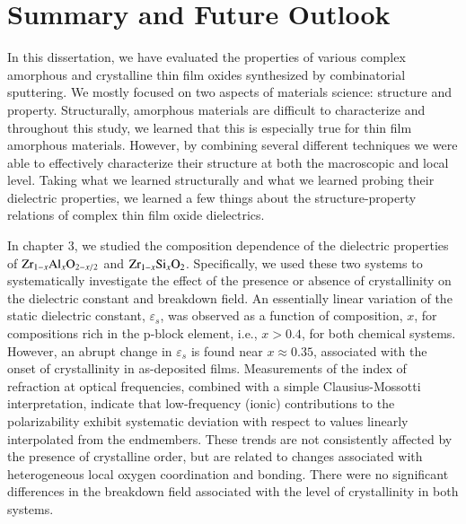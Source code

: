 \chapter{Summary and Future Outlook}

In this dissertation, we have evaluated the properties of various complex amorphous and crystalline thin film oxides synthesized by combinatorial sputtering. We mostly focused on two aspects of materials science: structure and property. Structurally, amorphous materials are difficult to characterize and throughout this study, we learned that this is especially true for thin film amorphous materials. However, by combining several different techniques we were able to effectively characterize their structure at both the macroscopic and local level. Taking what we learned structurally and what we learned probing their dielectric properties, we learned a few things about the structure-property relations of complex thin film oxide dielectrics.  

In chapter 3, we studied the composition dependence of the dielectric properties of $\textnormal{Zr}_{1-x}\textnormal{Al}_{x}\textnormal{O}_{2-x/2}$ and $\textnormal{Zr}_{1-x}\textnormal{Si}_{x}\textnormal{O}_{2}$. Specifically, we used these two systems to systematically investigate the effect of the presence or absence of crystallinity on the dielectric constant and breakdown field. An essentially linear variation of the static dielectric constant, $\varepsilon_s$, was observed as a function of composition, $x$, for compositions rich in the p-block element, i.e., $x>0.4$, for both chemical systems. However, an abrupt change in $\varepsilon_s$ is found near $x \approx 0.35$, associated with the onset of crystallinity in as-deposited films. Measurements of the index of refraction at optical frequencies, combined with a simple Clausius-Mossotti interpretation, indicate that low-frequency (ionic) contributions to the polarizability exhibit systematic deviation with respect to values linearly interpolated from the endmembers. These trends are not consistently affected by the presence of crystalline order, but are related to changes associated with heterogeneous local oxygen coordination and bonding. There were no significant differences in the breakdown field associated with the level of crystallinity in both systems.

